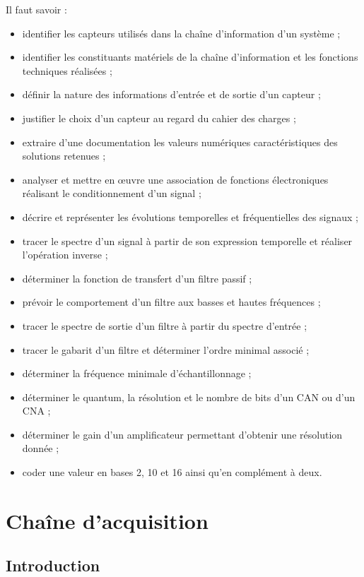 Il faut savoir :
\begin{itemize}
  \item identifier les capteurs utilisés dans la chaîne d'information d'un système ;
  \item identifier les constituants matériels de la chaîne d'information et les fonctions techniques réalisées ;
  \item définir la nature des informations d'entrée et de sortie d'un capteur ;
  \item justifier le choix d'un capteur au regard du cahier des charges ;
  \item extraire d'une documentation les valeurs numériques caractéristiques des solutions retenues ;
  \item analyser et mettre en œuvre une association de fonctions électroniques réalisant le conditionnement d'un signal ;
  \item décrire et représenter les évolutions temporelles et fréquentielles des signaux ;
  \item tracer le spectre d'un signal à partir de son expression temporelle et réaliser l'opération inverse ;
  \item déterminer la fonction de transfert d'un filtre passif ;
  \item prévoir le comportement d'un filtre aux basses et hautes fréquences ;
  \item tracer le spectre de sortie d'un filtre à partir du spectre d'entrée ;
  \item tracer le gabarit d'un filtre et déterminer l'ordre minimal associé ;
  \item déterminer la fréquence minimale d'échantillonnage ;
  \item déterminer le quantum, la résolution et le nombre de bits d'un CAN ou d'un CNA ;
  \item déterminer le gain d'un amplificateur permettant d'obtenir une résolution donnée ;
  \item coder une valeur en bases 2, 10 et 16 ainsi qu'en complément à deux.
\end{itemize}

\section{Chaîne d'acquisition}\label{sec:elec-chaine}

\subsection{Introduction}

